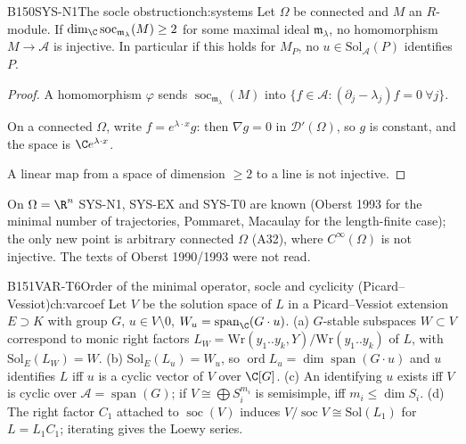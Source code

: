 \begin{dimcard}{B150}{SYS-N1}{The socle obstruction}{\pw}{ch:systems}
Let $\Omega$ be connected and $M$ an $R$-module. If $\dim_{\C}\operatorname{soc}_{\mathfrak m_\lambda}(M)\ge2$ for some maximal ideal $\mathfrak m_\lambda$, no homomorphism $M\to\mathcal A$ is injective. In particular if this holds for $M_P$, no $u\in\mathrm{Sol}_{\mathcal A}(P)$ identifies $P$.
\end{dimcard}

\begin{proof}
A homomorphism $\varphi$ sends $\operatorname{soc}_{\mathfrak m_\lambda}(M)$ into $\{f\in\mathcal A:(\partial_j-\lambda_j)f=0\ \forall j\}$.

On a connected $\Omega$, write $f=e^{\lambda\cdot x}g$: then $\nabla g=0$ in $\mathcal D'(\Omega)$, so $g$ is constant, and the space is $\C e^{\lambda\cdot x}$.

A linear map from a space of dimension $\ge2$ to a line is not injective.

\end{proof}

\begin{caution}[title={Prior art}]
On $\Omega=\R^n$ SYS-N1, SYS-EX and SYS-T0 are known (Oberst 1993 for the minimal number of trajectories, Pommaret, Macaulay for the length-finite case); the only new point is arbitrary connected $\Omega$ (A32), where $C^\infty(\Omega)$ is not injective. The texts of Oberst 1990/1993 were not read.
\end{caution}

\begin{dimcard}{B151}{VAR-T6}{Order of the minimal operator, socle and cyclicity (Picard--Vessiot)}{\cf}{ch:varcoef}
Let $V$ be the solution space of $L$ in a Picard--Vessiot extension $E\supset K$ with group $G$, $u\in V\setminus0$, $W_u=\operatorname{span}_{\C}(G\cdot u)$. (a) $G$-stable subspaces $W\subset V$ correspond to monic right factors $L_W=\mathrm{Wr}(y_1..y_k,Y)/\mathrm{Wr}(y_1..y_k)$ of $L$, with $\mathrm{Sol}_E(L_W)=W$. (b) $\mathrm{Sol}_E(L_u)=W_u$, so $\operatorname{ord}L_u=\dim\operatorname{span}(G\cdot u)$ and $u$ identifies $L$ iff $u$ is a cyclic vector of $V$ over $\C[G]$. (c) An identifying $u$ exists iff $V$ is cyclic over $\mathcal A=\operatorname{span}(G)$; if $V\cong\bigoplus S_i^{m_i}$ is semisimple, iff $m_i\le\dim S_i$. (d) The right factor $C_1$ attached to $\operatorname{soc}(V)$ induces $V/\operatorname{soc}V\cong\mathrm{Sol}(L_1)$ for $L=L_1C_1$; iterating gives the Loewy series.
\end{dimcard}

